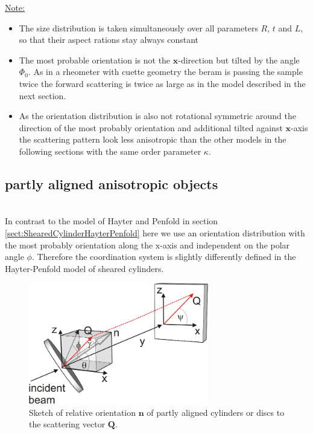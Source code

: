\uline{Note:}
\begin{itemize}
\item The size distribution is taken simultaneously over all parameters $R$, $t$ and $L$, so that their aspect rations stay always constant
\item The most probable orientation is not the $\mathbf{x}$-direction but tilted by the angle $\varPhi_0$. As in a rheometer with cuette geometry the beram is passing the sample twice the forward scattering is twice as large as in the model described in the next section.
\item As the orientation distribution is also not rotational symmetric around the direction of the most probably orientation and additional tilted against $\mathbf{x}$-axis the scattering pattern look less anisotropic than the other models in the following sections with the same order parameter $\kappa$.
\end{itemize}

\newpage
\subsection{partly aligned anisotropic objects}
\label{sect:partlyalignedCylShell}
~\\

In contrast to the model of Hayter and Penfold \cite{Hayter1984} in section \ref{sect:ShearedCylinderHayterPenfold} here we use an orientation distribution with the most probably orientation along the $\mathrm{x}$-axis and independent on the polar angle $\phi$.
Therefore the coordination system is slightly differently defined in the Hayter-Penfold model of sheared cylinders.
\begin{figure}[htb]
\begin{center}
\includegraphics[width=0.7\textwidth]{../images/form_factor/cylindrical_obj/partly_aligned_discs.png}
\end{center}
\caption{Sketch of relative orientation $\mathbf{n}$ of partly
aligned cylinders or discs to the scattering vector $\mathbf{Q}$.}
\label{fig:partly_aligned_discs}
\end{figure}

